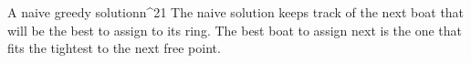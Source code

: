 \documentclass{writeup}
\begin{document}
\begin{solutions}
  \begin{solution}{A naive greedy solution}{n^2}{1}
    The naive solution keeps track of the next boat that will be the best to assign to its ring.
    The best boat to assign next is the one that fits the tightest to the next free point.

  \end{solution}
\end{solutions}
\end{document}
